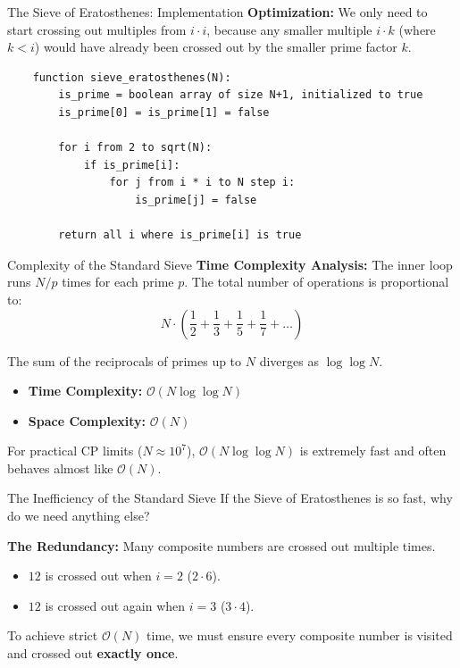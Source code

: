 \documentclass[aspectratio=169]{beamer}
\begin{document}
\begin{frame}[fragile]{The Sieve of Eratosthenes: Implementation}
    \textbf{Optimization:} We only need to start crossing out multiples from $i \cdot i$, because any smaller multiple $i \cdot k$ (where $k < i$) would have already been crossed out by the smaller prime factor $k$.
    
    \begin{verbatim}
    function sieve_eratosthenes(N):
        is_prime = boolean array of size N+1, initialized to true
        is_prime[0] = is_prime[1] = false
        
        for i from 2 to sqrt(N):
            if is_prime[i]:
                for j from i * i to N step i:
                    is_prime[j] = false
                    
        return all i where is_prime[i] is true
    \end{verbatim}
\end{frame}

\begin{frame}{Complexity of the Standard Sieve}
    \textbf{Time Complexity Analysis:}
    The inner loop runs $N/p$ times for each prime $p$. The total number of operations is proportional to:
    $$N \cdot \left( \frac{1}{2} + \frac{1}{3} + \frac{1}{5} + \frac{1}{7} + \dots \right)$$
    
    The sum of the reciprocals of primes up to $N$ diverges as $\log \log N$.
    \begin{itemize}
        \item \textbf{Time Complexity:} $\mathcal{O}(N \log \log N)$
        \item \textbf{Space Complexity:} $\mathcal{O}(N)$
    \end{itemize}
    
    \vspace{0.3cm}
    For practical CP limits ($N \approx 10^7$), $\mathcal{O}(N \log \log N)$ is extremely fast and often behaves almost like $\mathcal{O}(N)$.
\end{frame}

\begin{frame}{The Inefficiency of the Standard Sieve}
    If the Sieve of Eratosthenes is so fast, why do we need anything else?
    
    \vspace{0.3cm}
    \textbf{The Redundancy:} 
    Many composite numbers are crossed out multiple times. 
    \begin{itemize}
        \item $12$ is crossed out when $i=2$ ($2 \cdot 6$).
        \item $12$ is crossed out again when $i=3$ ($3 \cdot 4$).
    \end{itemize}
    
    To achieve strict $\mathcal{O}(N)$ time, we must ensure every composite number is visited and crossed out \textbf{exactly once}.
\end{frame}
\end{document}

